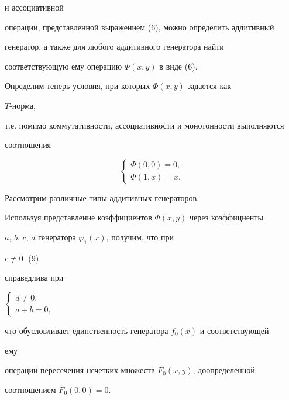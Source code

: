 и ассоциативной


операции, представленной выражением (6), можно определить аддитивный


генератор, а также для любого аддитивного генератора найти


соответствующую ему операцию $\Phi(x,y)$ в виде (6).





Определим теперь условия, при которых $\Phi(x,y)$ задается как


$T$-норма,


т.е. помимо коммутативности, ассоциативности и монотонности выполняются


соотношения


\begin{equation}


\begin{cases}


\Phi(0,0)=0,\\


\Phi(1,x)=x.


\end{cases}


\end{equation}





Рассмотрим различные типы аддитивных генераторов.





Используя представление коэффициентов $\Phi(x,y)$ через коэффициенты


$a$, $b$, $c$, $d$ генератора $\varphi_1(x)$, получим, что при


$c\ne 0\;$ (9)


справедлива при


$


\begin{cases}


d\ne 0,\\


a+b=0,


\end{cases}


$


что обусловливает единственность генератора $f_0(x)$ и соответствующей


ему


операции пересечения нечетких множеств $F_0(x,y)$, доопределенной


соотношением $F_0(0,0)=0$.





